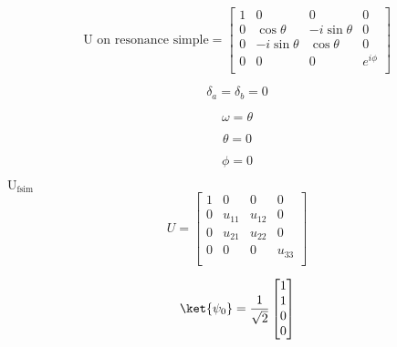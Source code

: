 \begin{equation}
    \text{U on resonance simple}=
    \begin{bmatrix}
        1 & 0            &  0              & 0 \\
        0 & \cos{\theta} & -i \sin{\theta} & 0 \\
        0 & -i \sin{\theta} & \cos{\theta} & 0 \\
        0 &  0              & 0            & e^{i \phi} \\
    \end{bmatrix}
\end{equation}


\begin{equation}
    \delta_{a} = \delta_{b} = 0
\end{equation}

\begin{equation}
    \omega = \theta
\end{equation}

\begin{equation}
    \theta=0
\end{equation}

\begin{equation}
    \phi=0
\end{equation}

$\textrm{U}_{\textrm{fsim}}$
\begin{equation}
    U =
    \begin{bmatrix}
        1 & 0 & 0 & 0 \\
        0 & u_{11} & u_{12} & 0 \\
        0 & u_{21} & u_{22} & 0 \\
        0 & 0 & 0 & u_{33} \\
    \end{bmatrix}
\end{equation}

\begin{equation}
    \ket{\psi_0}=\frac{1}{\sqrt{2}}
    \begin{bmatrix}
        1 \\
        1 \\
        0 \\
        0 \\
    \end{bmatrix}
\end{equation}

